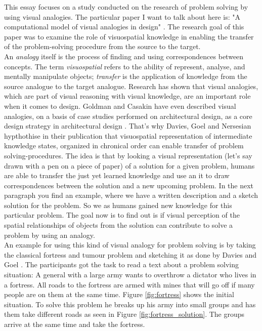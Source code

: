 \documentclass[12pt]{article}
\begin{document}
\noindent This essay focuses on a study conducted on the research of problem solving by using visual analogies. The particular paper I want to talk about here is: "A computational model of visual analogies in design" \cite{davies2009computational}. The research goal of this paper was to examine the role of visuospatial knowledge in enabling
the transfer of the problem-solving procedure from the source to the target. \\
\indent An \textit{analogy} itself is the process of finding and using correspondences between concepts. The term \textit{visuospatial} refers to the ability of represent, analyse, and mentally manipulate objects; \textit{transfer} is the application of knowledge from the source analogue to the target analogue. Research has shown that visual analogies, which are part of visual reasoning with visual knowledge, are an important role when it comes to design. Goldman and Casakin have even described visual analogies, on a basis of case studies performed on architectural design, as a core design strategy in architectural design \cite{casakin1999expertise}. That's why Davies, Goel and Nersesian hypthothise in their publication that visuospatial representation of intermediate knowledge states, organized in chronical order can enable transfer of problem solving-procedures. The idea is that by looking a visual representation (let's say drawn with a pen on a piece of paper) of a solution for a given problem, humans are able to transfer the just yet learned knowledge and use an it to draw correspondences between the solution and a new upcoming problem. In the next paragraph you find an example, where we have a written description and a sketch solution for the problem. So we as humans gained new knowledge for this particular problem. The goal now is to find out is if visual perception of the spatial relationships of objects from the solution can contribute to solve a 
problem by using an analogy. \\
\indent An example for using this kind of visual analogy for problem solving is by taking the classical fortress and tumour problem \cite{duncker1926qualitative} and sketching it as done by Davies and Goel \cite{davies2001visual}. The participants got the task to read a text about a problem solving situation: A general with a large army wants to overthrow a dictator who lives in a fortress. All roads to the fortress are armed with mines that will go off if many people are on them at the same time. Figure \ref{fig:fortress} shows the initial situation. To solve this problem he breaks up his army into small groups and has them take different roads as seen in Figure \ref{fig:fortress_solution}. The groups arrive at the same time and take the fortress.  
\end{document}

